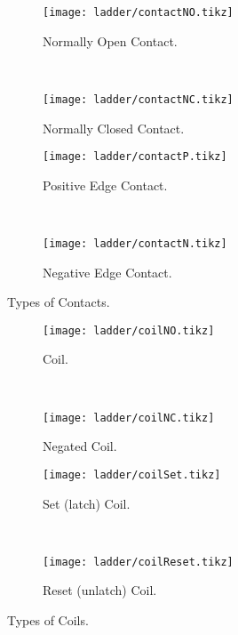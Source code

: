 \begin{figure}[H]
\begin{subfigure}[t]{0.45\textwidth}
  \centering \texttt{[image: ladder/contactNO.tikz]}
  \caption{Normally Open Contact.}
  \label{fig:contactNO}
\end{subfigure}
~
\begin{subfigure}[t]{0.45\textwidth}
  \centering \texttt{[image: ladder/contactNC.tikz]}
  \caption{Normally Closed Contact.}
  \label{fig:contactNC}
\end{subfigure}
\vspace{1em}

\begin{subfigure}[t]{0.45\textwidth}
  \centering \texttt{[image: ladder/contactP.tikz]}
  \caption{Positive Edge Contact.}
  \label{fig:contactP}
\end{subfigure}
~
\begin{subfigure}[t]{0.45\textwidth}
  \centering \texttt{[image: ladder/contactN.tikz]}
  \caption{Negative Edge Contact.}
  \label{fig:contactN}
\end{subfigure}

  \caption{Types of Contacts.}
  \label{fig:contacts}
\end{figure}

\begin{figure}[H]
\begin{subfigure}[t]{0.45\textwidth}
  \centering \texttt{[image: ladder/coilNO.tikz]}
  \caption{Coil.}
  \label{fig:contactNO}
\end{subfigure}
~
\begin{subfigure}[t]{0.45\textwidth}
  \centering \texttt{[image: ladder/coilNC.tikz]}
  \caption{Negated Coil.}
  \label{fig:contactNC}
\end{subfigure}
\vspace{1em}

\begin{subfigure}[t]{0.45\textwidth}
  \centering \texttt{[image: ladder/coilSet.tikz]}
  \caption{Set (latch) Coil.}
  \label{fig:contactP}
\end{subfigure}
~
\begin{subfigure}[t]{0.45\textwidth}
  \centering \texttt{[image: ladder/coilReset.tikz]}
  \caption{Reset (unlatch) Coil.}
  \label{fig:contactN}
\end{subfigure}

  \caption{Types of Coils.}
  \label{fig:coils}
\end{figure}

